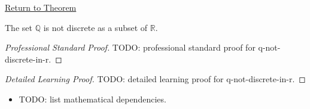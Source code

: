 \newpage
{}
\label{prf:q-not-discrete-in-r}

\begin{remark*}[Return]
\hyperref[cor:q-not-discrete-in-r]{Return to Theorem}
\end{remark*}

\begin{corollary*}
The set $\mathbb{Q}$ is not discrete as a subset of $\mathbb{R}$.
\end{corollary*}

\begin{proof}[Professional Standard Proof]
\LRAProofBodyStart
TODO: professional standard proof for q-not-discrete-in-r.
\end{proof}

\begin{proof}[Detailed Learning Proof]
\LRAProofBodyStart
TODO: detailed learning proof for q-not-discrete-in-r.
\end{proof}

\begin{remark*}
\end{remark*}

\begin{dependencies}
\begin{itemize}
  \item TODO: list mathematical dependencies.
\end{itemize}
\end{dependencies}

\clearpage
